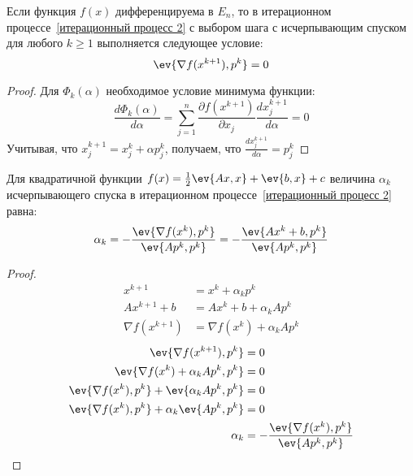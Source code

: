 \begin{theorem}
    Если функция \(f(x)\) дифференцируема в \(E_n\), то в итерационном процессе~\eqref{итерационный процесс 2} с выбором шага с исчерпывающим спуском для любого \(k \geq 1\) выполняется следующее условие:
    \begin{equation}
        \ev{\nabla f(x^{k + 1}), p^k} = 0
        \label{условие при процессе}
    \end{equation}
\end{theorem}
\begin{proof} %
    Для \(\Phi_k(\alpha)\) необходимое условие минимума функции:
    \[\frac{d \Phi_k(\alpha)}{d \alpha} = \sum_{j = 1}^n \frac{\partial f(x^{k + 1})}{\partial x_j} \frac{d x_j^{k + 1}}{d \alpha} = 0\]
    Учитывая, что \(x^{k + 1}_j = x_j^k + \alpha p_j^k\), получаем, что \(\frac{d x_j^{k + 1}}{d \alpha} = p_j^k\)
\end{proof}

\begin{theorem}
    Для квадратичной функции \(f(x) = \frac{1}{2} \ev{Ax, x} + \ev{b, x} + c\) величина \(\alpha_k\) исчерпывающего спуска в итерационном процессе~\eqref{итерационный процесс 2} равна:
    \begin{equation}
        \alpha_k = - \frac{\ev{\nabla f(x^k), p^k}}{\ev{A p^k, p^k}} = - \frac{\ev{Ax^k + b, p^k}}{\ev{Ap^k, p^k}}
        \label{alpha k в исчерпывающем спуске}
    \end{equation}
\end{theorem}
\begin{proof}
    \begin{align*}
        x^{k + 1}           & = x^k + \alpha_k p^k             \\
        Ax^{k + 1} + b      & = Ax^k + b + \alpha_k A p^k      \\
        \nabla f(x^{k + 1}) & = \nabla f(x^k) + \alpha_k A p^k
    \end{align*}
    \begin{align*}
        \ev{\nabla f(x^{k + 1}), p^k}                      & = 0                                                 \\
        \ev{\nabla f(x^k) + \alpha_k A p^k, p^k}           & = 0                                                 \\
        \ev{\nabla f(x^k), p^k} + \ev{\alpha_k A p^k, p^k} & = 0                                                 \\
        \ev{\nabla f(x^k), p^k} + \alpha_k \ev{A p^k, p^k} & = 0                                                 \\
        \alpha_k                                           & = - \frac{\ev{\nabla f(x^k), p^k}}{\ev{A p^k, p^k}}
    \end{align*}
\end{proof}

